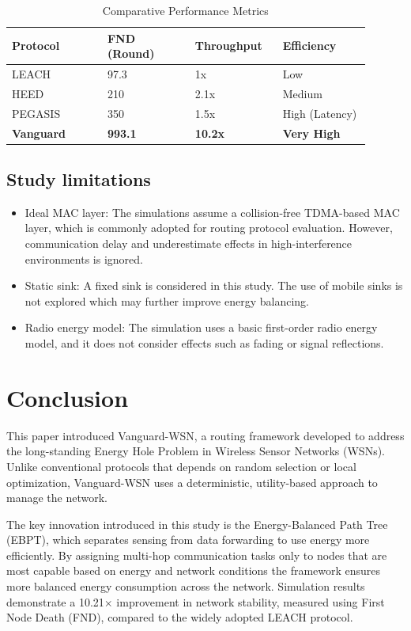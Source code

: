 \documentclass[conference]{IEEEtran}
\begin{document}
\begin{table}[htbp]
\caption{Comparative Performance Metrics}
\label{tab2}
\centering
\normalsize
\setlength{\tabcolsep}{4pt}
\begin{tabular}{|p{0.24\linewidth}|p{0.22\linewidth}|p{0.22\linewidth}|p{0.22\linewidth}|}
\hline
\textbf{Protocol} & \textbf{FND (Round)} & \textbf{Throughput} & \textbf{Efficiency} \\
\hline
LEACH & 97.3 & 1x & Low \\
HEED & 210 & 2.1x & Medium \\
PEGASIS & 350 & 1.5x & High (Latency) \\
\textbf{Vanguard} & \textbf{993.1} & \textbf{10.2x} & \textbf{Very High} \\
\hline
\end{tabular}
\end{table}

\subsection{Study limitations}
\begin{itemize}
    \item Ideal MAC layer: The simulations assume a collision-free TDMA-based MAC layer, which is commonly adopted for routing protocol evaluation. However, communication delay and underestimate effects in high-interference environments is ignored.
    \item Static sink: A fixed sink is considered in this study. The use of mobile sinks is not explored which may further improve energy balancing.
    \item Radio energy model: The simulation uses a basic first-order radio energy model, and it does not consider effects such as fading or signal reflections.
\end{itemize}

\section{Conclusion}
This paper introduced Vanguard-WSN, a routing framework developed to address the long-standing Energy Hole Problem in Wireless Sensor Networks (WSNs). Unlike conventional protocols that depends on random selection or local optimization, Vanguard-WSN uses a deterministic, utility-based approach to manage the network.

The key innovation introduced in this study is the Energy-Balanced Path Tree (EBPT), which separates sensing from data forwarding to use energy more efficiently. By assigning multi-hop communication tasks only to nodes that are most capable based on energy and network conditions the framework ensures more balanced energy consumption across the network. Simulation results demonstrate a 10.21$\times$ improvement in network stability, measured using First Node Death (FND), compared to the widely adopted LEACH protocol.
\end{document}
